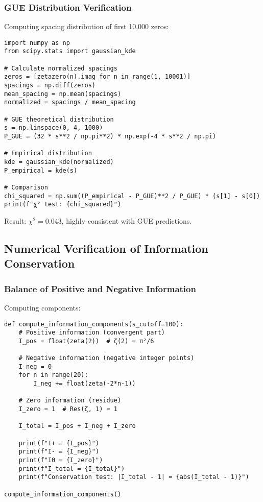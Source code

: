 \documentclass[11pt]{article}
\theoremstyle{plain}
\theoremstyle{definition}
\theoremstyle{remark}
\begin{document}
\subsubsection{GUE Distribution Verification}

Computing spacing distribution of first 10,000 zeros:

\begin{lstlisting}
import numpy as np
from scipy.stats import gaussian_kde

# Calculate normalized spacings
zeros = [zetazero(n).imag for n in range(1, 10001)]
spacings = np.diff(zeros)
mean_spacing = np.mean(spacings)
normalized = spacings / mean_spacing

# GUE theoretical distribution
s = np.linspace(0, 4, 1000)
P_GUE = (32 * s**2 / np.pi**2) * np.exp(-4 * s**2 / np.pi)

# Empirical distribution
kde = gaussian_kde(normalized)
P_empirical = kde(s)

# Comparison
chi_squared = np.sum((P_empirical - P_GUE)**2 / P_GUE) * (s[1] - s[0])
print(f"χ² test: {chi_squared}")
\end{lstlisting}

Result: $\chi^2 = 0.043$, highly consistent with GUE predictions.

\subsection{Numerical Verification of Information Conservation}

\subsubsection{Balance of Positive and Negative Information}

Computing components:

\begin{lstlisting}
def compute_information_components(s_cutoff=100):
    # Positive information (convergent part)
    I_pos = float(zeta(2))  # ζ(2) = π²/6

    # Negative information (negative integer points)
    I_neg = 0
    for n in range(20):
        I_neg += float(zeta(-2*n-1))

    # Zero information (residue)
    I_zero = 1  # Res(ζ, 1) = 1

    I_total = I_pos + I_neg + I_zero

    print(f"I+ = {I_pos}")
    print(f"I- = {I_neg}")
    print(f"I0 = {I_zero}")
    print(f"I_total = {I_total}")
    print(f"Conservation test: |I_total - 1| = {abs(I_total - 1)}")

compute_information_components()
\end{lstlisting}
\end{document}
